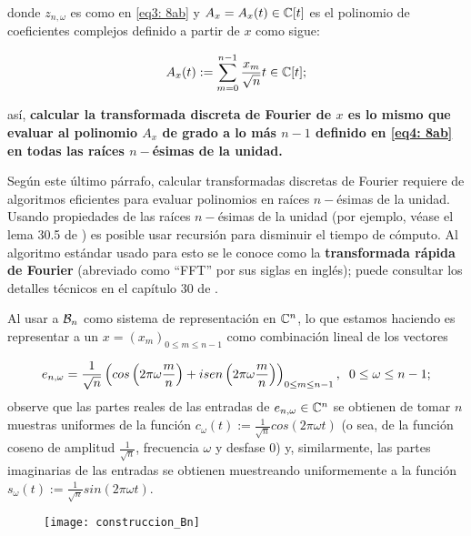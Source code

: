 \noindent
donde $z_{n, \omega}$ es como en \eqref{eq3: 8ab} y 
$A_{x} = A_{x}(t) \in \mathbb{C}[t]$ es el polinomio de 
coeficientes complejos definido 
a partir de $x$ como sigue:

	\begin{equation}
		\label{eq4: 8ab}
		A_{x}(t) := \sum\limits_{m=0}^{n-1}\frac{x_{m}}{\sqrt{n}} t\in \mathbb{C}[t];
	\end{equation}

\noindent
así, \textbf{calcular la transformada
discreta de Fourier de $x$ es lo mismo que evaluar al polinomio 
$A_{x}$ de grado a lo más $n-1$ definido en \eqref{eq4: 8ab} en todas las raíces
$n-$ésimas de la unidad.} 


\begin{nota}
Según este último párrafo, calcular transformadas discretas
de Fourier requiere de algoritmos eficientes para evaluar
polinomios en raíces $n-$ésimas de la unidad. Usando propiedades
de las raíces $n-$ésimas de la unidad (por ejemplo,
véase el lema 30.5 de \cite{algorithms}) 
es posible usar recursión para disminuir
el tiempo de cómputo. Al algoritmo estándar usado para
esto se le conoce como la \textbf{transformada rápida de 
Fourier} (abreviado como ``FFT'' por sus siglas en inglés);
puede consultar los detalles técnicos en el capítulo
30 de \cite{algorithms}.
\end{nota}


Al usar a $\mathcal{B}_{n}$ como sistema de representación en
$\mathbb{C}^{n}$, lo que estamos haciendo es representar a
un $x = (x_{m})_{0 \leq m \leq n-1}$ como combinación
lineal de los vectores 

\[
e_{n,\omega} = \frac{1}{\sqrt{n}} \left( cos
\left( 2 \pi \omega \frac{m}{n} \right)
+ i sen \left( 2 \pi \omega \frac{m}{n}\right) \right)_{0\leq m \leq n-1},
\hspace{0.2cm} 0 \leq \omega \leq n-1;
\]
observe que las partes reales de las
entradas de $e_{n,\omega} \in \mathbb{C}^{n}$ se obtienen de tomar $n$
muestras uniformes de la función 
$c_{\omega}(t) := \frac{1}{\sqrt{n}} cos (2 \pi \omega t)$ (o sea, de la función
coseno de amplitud $\frac{1}{\sqrt{n}}$, frecuencia $\omega$ y desfase $0$)
y, similarmente,
las partes imaginarias de las entradas se obtienen muestreando
uniformemente a la función 
$s_{\omega}(t) := \frac{1}{\sqrt{n}}  sin (2 \pi \omega t)$.

\begin{figure}[H]
	\centering
	\texttt{[image: construccion\_Bn]} 
\end{figure}	

